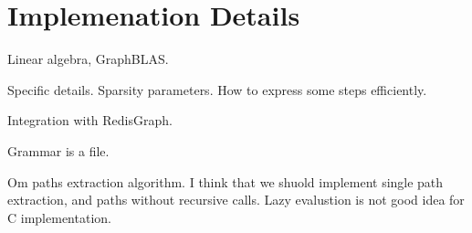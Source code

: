 \section{Implemenation Details}

Linear algebra, GraphBLAS.

Specific details. Sparsity parameters. How to express some steps efficiently.


Integration with RedisGraph.

Grammar is a file.

Om paths extraction algorithm. I think that we shuold implement single path extraction, and paths without recursive calls. Lazy evalustion is not good idea for C implementation.